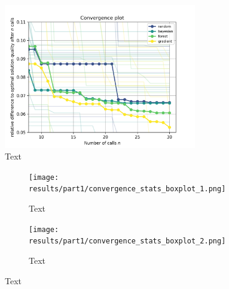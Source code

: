 \begin{figure}[h]
	\centering
	\includegraphics[width=0.75\textwidth]{results/part1/convergence_all.png}
	\caption{Text}
	\label{fig:convergence_all}
\end{figure}


\begin{figure}[h]
	\centering
	\begin{subfigure}{0.495\textwidth}
		\texttt{[image: results/part1/convergence\_stats\_boxplot\_1.png]}
		\caption{Text}
		\label{fig:convergence_stats_boxplot_1}
	\end{subfigure}
	\begin{subfigure}{0.495\textwidth}
		\texttt{[image: results/part1/convergence\_stats\_boxplot\_2.png]}
		\caption{Text}
		\label{fig:convergence_stats_boxplot_2}
	\end{subfigure}
	\caption{Text}
	\label{fig:convergence_stats_boxplots}
\end{figure}

